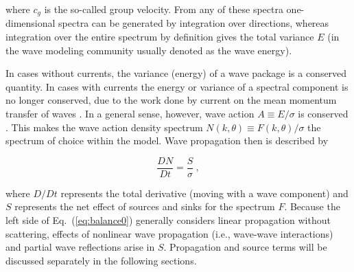 \noindent 
where $c_g$ is the so-called group velocity.  From any of these spectra
one-dimensional spectra can be generated by integration over directions,
whereas integration over the entire spectrum by definition gives the total
variance $E$ (in the wave modeling community usually denoted as the wave
energy).

In cases without currents, the variance (energy) of a wave package is a
conserved quantity. In cases with currents the energy or variance of a
spectral component is no longer conserved, due to the work done by current on
the mean momentum transfer of waves \citep{art:LHS61,art:LHS62}. In a general
sense, however, wave action $A \equiv E/\sigma$ is conserved
\citep[e.g.,][]{art:Whi65,art:BG68}. This makes the wave action density
spectrum $N(k,\theta) \equiv F(k,\theta)/\sigma$ the spectrum of choice within
the model. Wave propagation then is described by


\begin{equation}
\frac{D N}{D t} = \frac{S}{\sigma} \: ,
\label{eq:balance0}
\end{equation}

\noindent 
where $D/Dt$ represents the total derivative (moving with a wave component)
and $S$ represents the net effect of sources and sinks for the spectrum
$F$. Because the left side of Eq.~(\ref{eq:balance0}) generally considers
linear propagation without scattering, effects of nonlinear wave propagation
(i.e., wave-wave interactions) and partial wave reflections arise in
$S$. Propagation and source terms will be discussed separately in the
following sections.
